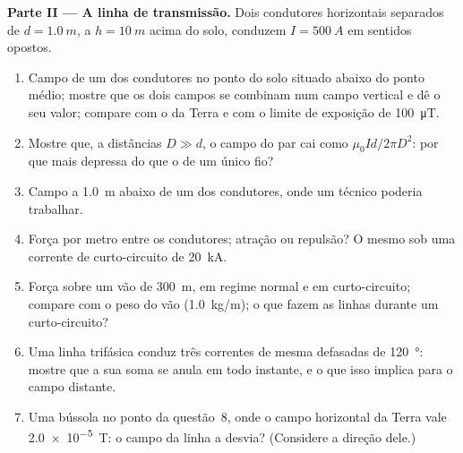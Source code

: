 \begin{problem}
\medskip
\noindent\textbf{Parte II --- A linha de transmissão.}
Dois condutores horizontais separados de $d = \qty{1.0}{m}$, a $h = \qty{10}{m}$ acima
do solo, conduzem $I = \qty{500}{A}$ em sentidos opostos.
\begin{enumerate}[resume]
  \item Campo de um dos condutores no ponto do solo situado abaixo do
        ponto médio; mostre que os dois campos se combinam num campo vertical
        e dê o seu valor; compare com o da Terra e com o
        limite de exposição de \qty{100}{\micro T}.
  \item Mostre que, a distâncias $D \gg d$, o campo do par cai como
        $\mu_0Id/2\pi D^2$: por que mais depressa do que o de um único fio?
  \item Campo a \qty{1.0}{m} abaixo de um dos condutores, onde um técnico
        poderia trabalhar.
  \item Força por metro entre os condutores; atração ou
        repulsão? O mesmo sob uma corrente de curto-circuito de \qty{20}{kA}.
  \item Força sobre um vão de \qty{300}{m}, em regime normal e em curto-circuito;
        compare com o peso do vão (\qty{1.0}{kg/m}); o que fazem as linhas
        durante um curto-circuito?
  \item Uma linha trifásica conduz três correntes de mesma 
        defasadas de \qty{120}{\degree}: mostre que a sua soma se anula em
        todo instante, e o que isso implica para o campo distante.
  \item Uma bússola no ponto da questão~8, onde o campo horizontal da Terra
        vale \qty{2.0e-5}{T}: o campo da linha a
        desvia? (Considere a direção dele.)
\end{enumerate}


\end{problem}

